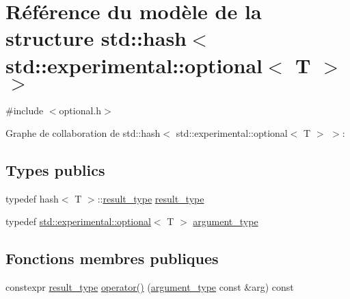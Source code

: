 \hypertarget{structstd_1_1hash_3_01std_1_1experimental_1_1optional_3_01_t_01_4_01_4}{}\section{Référence du modèle de la structure std\+:\+:hash$<$ std\+:\+:experimental\+:\+:optional$<$ T $>$ $>$}
\label{structstd_1_1hash_3_01std_1_1experimental_1_1optional_3_01_t_01_4_01_4}


{\ttfamily \#include $<$optional.\+h$>$}



Graphe de collaboration de std\+:\+:hash$<$ std\+:\+:experimental\+:\+:optional$<$ T $>$ $>$\+:
\subsection*{Types publics}
\begin{DoxyCompactItemize}
\item 
typedef hash$<$ T $>$\+::\hyperlink{structstd_1_1hash_3_01std_1_1experimental_1_1optional_3_01_t_01_4_01_4_a1ffc134496ff2e1dedb167899d460b6b}{result\+\_\+type} \hyperlink{structstd_1_1hash_3_01std_1_1experimental_1_1optional_3_01_t_01_4_01_4_a1ffc134496ff2e1dedb167899d460b6b}{result\+\_\+type}
\item 
typedef \hyperlink{classstd_1_1experimental_1_1optional}{std\+::experimental\+::optional}$<$ T $>$ \hyperlink{structstd_1_1hash_3_01std_1_1experimental_1_1optional_3_01_t_01_4_01_4_a990f41de75472068a98961bde97c9f6f}{argument\+\_\+type}
\end{DoxyCompactItemize}
\subsection*{Fonctions membres publiques}
\begin{DoxyCompactItemize}
\item 
constexpr \hyperlink{structstd_1_1hash_3_01std_1_1experimental_1_1optional_3_01_t_01_4_01_4_a1ffc134496ff2e1dedb167899d460b6b}{result\+\_\+type} \hyperlink{structstd_1_1hash_3_01std_1_1experimental_1_1optional_3_01_t_01_4_01_4_a3fbf26e96a387fac81dc1fcaf163ce3c}{operator()} (\hyperlink{structstd_1_1hash_3_01std_1_1experimental_1_1optional_3_01_t_01_4_01_4_a990f41de75472068a98961bde97c9f6f}{argument\+\_\+type} const \&arg) const
\end{DoxyCompactItemize}



